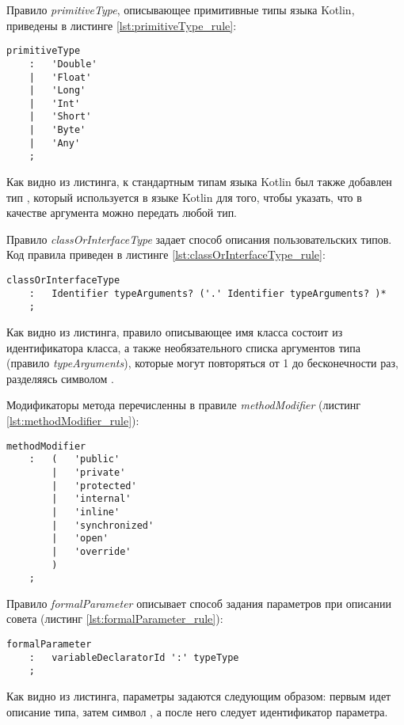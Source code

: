 Правило \textit{primitiveType}, описывающее примитивные типы языка Kotlin, приведены в листинге \ref{lst:primitiveType_rule}:
\begin{lstlisting}[style={java}, label={lst:primitiveType_rule},
  caption={Правило primitiveType}]
primitiveType
    :   'Double'
    |   'Float'
    |   'Long'
    |   'Int'
    |   'Short'
    |   'Byte'
    |   'Any'
    ;
\end{lstlisting}
Как видно из листинга, к стандартным типам языка Kotlin был также добавлен тип , который используется в языке Kotlin для того, чтобы указать, что в качестве аргумента можно передать любой тип.

Правило \textit{classOrInterfaceType} задает способ описания пользовательских типов.
Код правила приведен в листинге \ref{lst:classOrInterfaceType_rule}:
\begin{lstlisting}[style={java}, label={lst:classOrInterfaceType_rule},
  caption={Правило classOrInterfaceType}]
classOrInterfaceType
    :   Identifier typeArguments? ('.' Identifier typeArguments? )*
    ;
\end{lstlisting}
Как видно из листинга, правило описывающее имя класса состоит из идентификатора класса, а также необязательного списка аргументов типа (правило \textit{typeArguments}), которые могут повторяться от 1 до бесконечности раз, разделяясь символом .

Модификаторы метода перечисленны в правиле \textit{methodModifier} (листинг \ref{lst:methodModifier_rule}):
\begin{lstlisting}[style={java}, label={lst:methodModifier_rule},
  caption={Правило methodModifier}]
methodModifier
	:	(	'public'
		|	'private'
		|	'protected'
		|	'internal'
		|	'inline'
		|	'synchronized'
		|	'open'
		|	'override'
		)
	;
\end{lstlisting}

Правило \textit{formalParameter} описывает способ задания параметров при описании совета (листинг \ref{lst:formalParameter_rule}):
\begin{lstlisting}[style={java}, label={lst:formalParameter_rule},
  caption={Правило formalParameter}]
formalParameter
    :   variableDeclaratorId ':' typeType
    ;
\end{lstlisting}
Как видно из листинга, параметры задаются следующим образом: первым идет описание типа, затем символ \quotes{:}, а после него следует идентификатор параметра.

